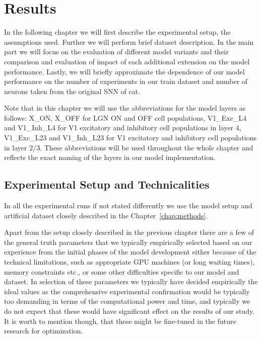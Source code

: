 \chapter{Results}
\label{chap:results}

In the following chapter we will first describe the experimental setup, the assumptions used. Further we will perform brief dataset description. In the main part we will focus on the evaluation of different model variants and their comparison and evaluation of impact of each additional extension on the model performance. Lastly, we will briefly approximate the dependence of our model performance on the number of experiments in our train dataset and number of neurons taken from the original SNN of cat.

Note that in this chapter we will use the abbreviations for the model layers as follows: X\_ON, X\_OFF for LGN ON and OFF cell populations, V1\_Exc\_L4 and V1\_Inh\_L4 for V1 excitatory and inhibitory cell populations in layer 4, V1\_Exc\_L23 and V1\_Inh\_L23 for V1 excitatory and inhibitory cell populations in layer 2/3. These abbreviations will be used throughout the whole chapter and reflects the exact naming of the layers in our model implementation.

\section{Experimental Setup and Technicalities}
\label{sec:experimental_setup}
In all the experimental runs if not stated differently we use the model setup and artificial dataset closely described in the Chapter~\ref{chap:methods}.

Apart from the setup closely described in the previous chapter there are a few of the general truth parameters that we typically empirically selected based on our experience from the initial phases of the model development either because of the technical limitations, such as appropriate GPU machines (or long waiting times), memory constraints etc., or some other difficulties specific to our model and dataset. In selection of these parameters we typically have decided empirically the ideal values as the comprehensive experimental confirmation would be typically too demanding in terms of the computational power and time, and typically we do not expect that these would have significant effect on the results of our study. It is worth to mention though, that these might be fine-tuned in the future research for optimization.

